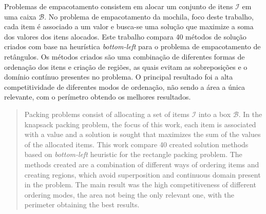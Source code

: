 \begin{resumo}
    Problemas de empacotamento consistem em alocar um conjunto de itens $\mathcal{I}$ em uma
    caixa $\mathcal{B}$.
    No problema de empacotamento da mochila, foco deste trabalho, cada item é associado a um valor
    e busca-se uma solução que maximize a soma dos valores dos itens alocados.
    Este trabalho compara 40 métodos de solução criados com base na heurística
    \textit{bottom-left} para o problema de empacotamento de retângulos.
    Os métodos criados são uma combinação de diferentes formas de ordenação dos itens e criação
    de regiões, as quais evitam as sobreposições e o domínio contínuo presentes no problema.
    O principal resultado foi a alta competitividade de diferentes modos de ordenação,
    não sendo a área a única relevante, com o perímetro obtendo os melhores resultados.
\end{resumo}

\begin{abstract}
    Packing problems consist of allocating a set of items $\mathcal{I}$ into a box $\mathcal{B}$.
    In the knapsack packing problem, the focus of this work, each item is associated with a value
    and a solution is sought that maximizes the sum of the values of the allocated items.
    This work compare 40 created solution methods based on \textit{bottom-left}
    heuristic for the rectangle packing problem.
    The methods created are a combination of different ways of ordering items and creating regions,
    which avoid superposition and continuous domain present in the problem.
    The main result was the high competitiveness of different ordering modes, the area not being
    the only relevant one, with the perimeter obtaining the best results.
\end{abstract}
